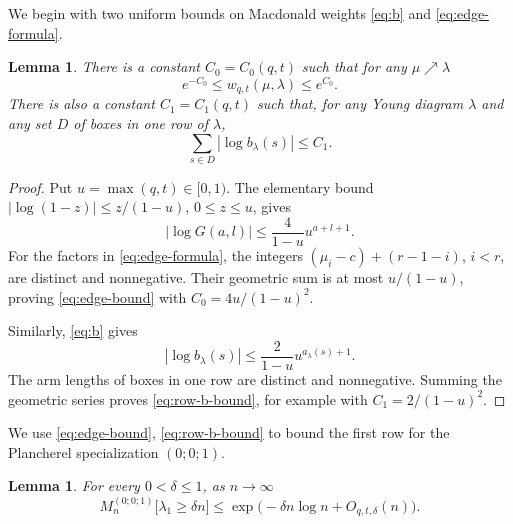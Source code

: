 \documentclass[11pt,reqno]{amsart}
\newtheorem{lemma}[theorem]{Lemma}
\theoremstyle{definition}
\theoremstyle{remark}
\numberwithin{equation}{section}
\begin{document}
We begin with two uniform bounds on Macdonald weights \eqref{eq:b} and \eqref{eq:edge-formula}.
\begin{lemma}\label{lem:weights}
There is a constant $C_0=C_0(q,t)$ such that for any $\mu\nearrow\lambda$
\begin{equation}\label{eq:edge-bound}
 e^{-C_0}\le w_{q,t}(\mu,\lambda)\le e^{C_0}.
\end{equation}
There is also a constant $C_1=C_1(q,t)$ such that, for any Young diagram $\lambda$
and any set $D$ of boxes in one row of $\lambda$,
\begin{equation}\label{eq:row-b-bound}
 \sum_{s\in D}|\log b_\lambda(s)|\le C_1.
\end{equation}
\end{lemma}

\begin{proof}
Put $u=\max(q,t)\in[0,1)$. The elementary bound
$|\log(1-z)|\le z/(1-u)$, $0\le z\le u$, gives
\[
 |\log G(a,l)|\le\frac{4}{1-u}u^{a+l+1}.
\]
For the factors in \eqref{eq:edge-formula}, the integers
$(\mu_i-c)+(r-1-i)$, $i<r$, are distinct and nonnegative.
Their geometric sum is at most $u/(1-u)$, proving
\eqref{eq:edge-bound} with $C_0=4u/(1-u)^2$.

Similarly, \eqref{eq:b} gives
\[
 |\log b_\lambda(s)|\le\frac{2}{1-u}u^{a_\lambda(s)+1}.
\]
The arm lengths of boxes in one row are distinct and nonnegative.
Summing the geometric series proves \eqref{eq:row-b-bound}, for example
with $C_1=2/(1-u)^2$.
\end{proof}

We use \eqref{eq:edge-bound}, \eqref{eq:row-b-bound} to bound the first row for the Plancherel specialization $(0;0;1)$.

\begin{lemma}\label{lem:plancherel}
For every $0<\delta\le1$, as $n\to\infty$
\begin{equation}\label{eq:plancherel-tail}
 M_n^{(0;0;1)}\bigl[\lambda_1\ge\delta n\bigr]
 \le \exp\bigl(-\delta n\log n+O_{q,t,\delta}(n)\bigr).
\end{equation}
\end{lemma}
\end{document}
